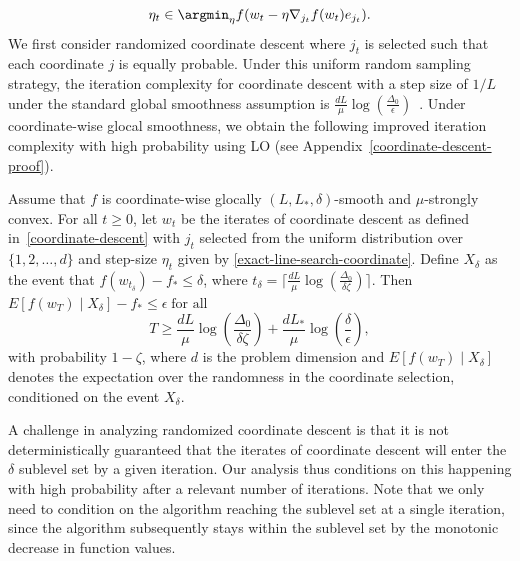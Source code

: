 \documentclass[10pt]{article} %
\begin{document}
\begin{equation}
    \label{exact-line-search-coordinate}
    \eta_{t} \in \argmin_{\eta} f(w_{t} - \eta \nabla_{j_{t}} f(w_{t})e_{j_{t}}).
\end{equation}
We first consider randomized coordinate descent where $j_t$ is selected such that each coordinate $j$ is equally probable.
Under this uniform random sampling strategy, the iteration complexity for coordinate descent with a step size of $1/L$ under the standard global smoothness assumption is $\frac{dL}{\mu}\log(\frac{\Delta_0}{\epsilon})$~\cite{nesterov2012cd}. Under coordinate-wise glocal smoothness, we obtain the following improved iteration complexity with high probability using LO (see Appendix~\ref{coordinate-descent-proof}).
\begin{theorem}
    \label{coordinate-descent-theorem}
    Assume that $f$ is coordinate-wise glocally $(L, L_*, \delta)$-smooth and $\mu$-strongly convex. For all $t \geq 0$, let $w_t$ be the iterates of coordinate descent as defined in~\eqref{coordinate-descent} with $j_t$ selected from the uniform distribution over $\{1,2,\dots,d\}$ and step-size $\eta_t$ given by \eqref{exact-line-search-coordinate}. Define $X_{\delta}$ as the event that $f(w_{t_{\delta}}) - f_{*} \leq \delta$, where $t_\delta = \lceil \frac{dL}{\mu}\log\left(\frac{\Delta_{0}}{\delta\zeta}\right) \rceil$. Then $E[f(w_T)\;|\;X_{\delta}] - f_* \leq \epsilon \;\text{for all}$
    \begin{equation*}
        T \geq
        \frac{dL}{\mu}\log\left(\frac{\Delta_{0}}{\delta \zeta}\right) + \frac{dL_*}{\mu}\log\left(\frac{\delta}{\epsilon}\right),
    \end{equation*}
    with probability $1 - \zeta$, where $d$ is the problem dimension and $E[f(w_T)\;|\; X_{\delta}]$ denotes the expectation over the randomness in the coordinate selection, conditioned on the event $X_{\delta}$.
\end{theorem}
A challenge in analyzing randomized coordinate descent is that it is not deterministically guaranteed that the iterates of coordinate descent will enter the $\delta$ sublevel set by a given iteration. Our analysis thus conditions on this happening with high probability after a relevant number of iterations. Note that we only need to condition on the algorithm reaching the sublevel set at a single iteration, since the algorithm subsequently stays within the sublevel set by the monotonic decrease in function values.
\end{document}
